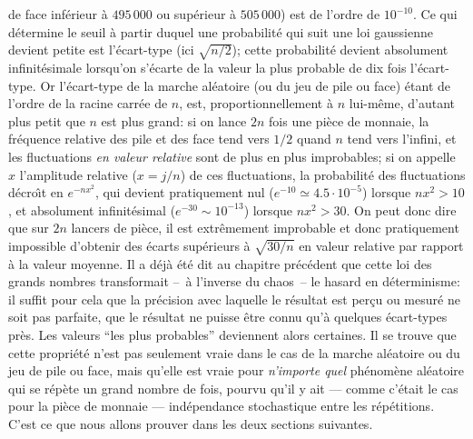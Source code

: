 de face inf\'erieur \`a $495\, 000$ ou sup\'erieur \`a $505\, 000$) est de
l'ordre de $10^{-10}$.
\medskip
Ce qui d\'etermine le seuil \`a partir duquel une probabilit\'e qui suit une
loi gaussienne devient petite est l'\'ecart-type (ici $\sqrt{n/2}$); cette
probabilit\'e devient absolument infinit\'esimale lorsqu'on s'\'ecarte de la
valeur la plus probable de dix fois l'\'ecart-type. Or l'\'ecart-type de la
marche al\'eatoire (ou du jeu de pile ou face) \'etant de l'ordre de la racine
carr\'ee de $n$, est, proportionnellement \`a $n$ lui-m\^eme, d'autant plus
petit que $n$ est plus grand: si on lance $2n$ fois une pi\`ece de monnaie, 
la fr\'equence relative des pile et des face tend vers $1/2$ quand $n$ tend
vers l'infini, et les fluctuations {\it en valeur relative} sont de plus en
plus improbables; si on appelle $x$ l'amplitude relative ($x=j/n$)  de ces
fluctuations, la probabilit\'e des fluctuations d\'ecro{\^\i}t en $e^{-nx^2}$,
qui devient pratiquement nul ($e^{-10} \simeq 4.5 \cdot 10^{-5}$) lorsque
$nx^2 > 10$, et absolument infinit\'esimal ($e^{-30} \sim 10^{-13}$)
lorsque $nx^2 > 30$. On peut donc dire que sur $2n$ lancers de pi\`ece, il
est extr\^emement improbable et donc pratiquement impossible d'obtenir
des \'ecarts sup\'erieurs \`a $\sqrt{30 / n}$ en valeur relative par rapport
\`a la valeur moyenne.
\medskip
Il a d\'ej\`a \'et\'e dit au chapitre pr\'ec\'edent que cette loi des grands 
nombres transformait --~\`a l'inverse du chaos~-- le hasard en
d\'eterminisme: il suffit pour cela que la pr\'ecision avec laquelle le
r\'esultat est per\c{c}u ou mesur\'e ne soit pas parfaite, que le r\'esultat
ne puisse \^etre connu qu'\`a quelques \'ecart-types pr\`es. Les valeurs
``les plus probables'' deviennent alors certaines.
\medskip
Il se trouve que cette propri\'et\'e n'est pas seulement vraie
dans le cas de la marche al\'eatoire ou du jeu de pile ou face, mais qu'elle
est vraie pour {\it n'importe quel} ph\'enom\`ene al\'eatoire qui se
r\'ep\`ete un grand nombre de fois, pourvu qu'il y ait --- comme c'\'etait le
cas pour la pi\`ece de monnaie --- ind\'ependance stochastique entre les
r\'ep\'etitions. C'est ce que nous allons prouver dans les deux sections
suivantes.

\bigskip


